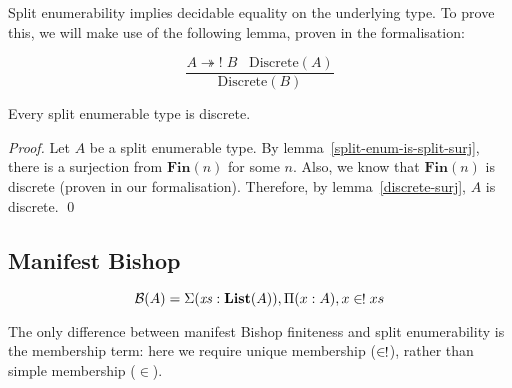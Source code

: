 Split enumerability implies decidable equality on the underlying type.
To prove this, we will make use of the following lemma, proven in the
formalisation:
\begin{romlemma} \label{discrete-surj}
  \begin{equation}
    \frac{
        A \twoheadrightarrow! \; B \; \; \; \text{Discrete}(A)
      }{
       \text{Discrete}(B) 
      }
  \end{equation}
\end{romlemma}
\begin{romlemma}
  Every split enumerable type is discrete.
\end{romlemma}
\begin{proof}
  Let \(A\) be a split enumerable type.
  By lemma~\ref{split-enum-is-split-surj}, there is a surjection from
  \(\mathbf{Fin}(n)\) for some \(n\).
  Also, we know that \(\mathbf{Fin}(n)\) is discrete (proven in our
  formalisation).
  Therefore, by lemma~\ref{discrete-surj}, \(A\) is discrete.
  \qed
\end{proof}
\subsection{Manifest Bishop}
\begin{romdefinition}
  \begin{equation}
    \mathcal{B}(A) = \Sigma {(\mathit{xs} : \textbf{List}(A))} , \Pi {(x : A)} , x \inunique xs
  \end{equation}
\end{romdefinition}
The only difference between manifest Bishop finiteness and split enumerability
is the membership term: here we require unique membership (\(\inunique\)),
rather than simple membership (\(\in\)).

